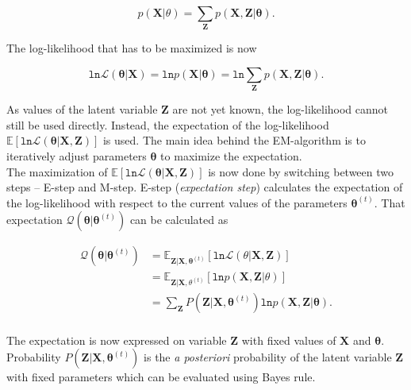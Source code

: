 $$ p(\mathbf{X} | \theta) = \sum_{\mathbf{Z}}p(\mathbf{X}, \mathbf{Z} | \boldsymbol \theta). $$

The log-likelihood that has to be maximized is now 

\begin{equation}
	\mathtt{ln}\mathcal{L}(\boldsymbol \theta | \mathbf{X}) = \mathtt{ln}p(\mathbf{X} | \boldsymbol \theta) = \mathtt{ln}\sum_{\mathbf{Z}}p(\mathbf{X}, \mathbf{Z} | \boldsymbol \theta).
\end{equation}

As values of the latent variable $\mathbf{Z}$ are not yet known, the log-likelihood cannot still be used directly. Instead,  the expectation of the log-likelihood $\mathbb{E}[ \mathtt{ln} \mathcal{L}(\boldsymbol \theta | \mathbf{X}, \mathbf{Z}) ]$ is used. The main idea behind the EM-algorithm is to iteratively adjust parameters $\boldsymbol \theta$ to maximize the expectation. \\

The maximization of  $\mathbb{E}[ \mathtt{ln} \mathcal{L}(\boldsymbol \theta | \mathbf{X}, \mathbf{Z}) ]$ is now done by switching between two steps -- E-step and M-step. E-step (\textit{expectation step}) calculates the expectation of the log-likelihood with respect to the current values of the parameters  $ \boldsymbol\theta^{(t)}$. That expectation $\mathcal{Q}( \boldsymbol \theta | \boldsymbol \theta^{(t)})$ can be calculated as

\begin{equation} \label{eq1}
\begin{split}
  \mathcal{Q}(\boldsymbol \theta | \boldsymbol \theta^{(t)}) &= \mathbb{E}_{\mathbf{Z} | \mathbf{X}, \boldsymbol \theta^{(t)}}[ \mathtt{ln} \mathcal{L}(\theta | \mathbf{X}, \mathbf{Z}) ] \\
     &= \mathbb{E}_{\mathbf{Z} | \mathbf{X}, \theta^{(t)}}[ \mathtt{ln} p(\mathbf{X}, \mathbf{Z} | \theta) ] \\
      &= \sum_{\mathbf{Z}}P(\mathbf{Z}| \mathbf{X}, \boldsymbol \theta^{(t)})\mathtt{ln} p(\mathbf{X}, \mathbf{Z} | \boldsymbol \theta). \\
\end{split}
\end{equation}

The expectation is now expressed on variable $\mathbf{Z}$ with fixed values of $\mathbf{X}$ and $\boldsymbol \theta$. Probability $P(\mathbf{Z}| \mathbf{X}, \boldsymbol \theta^{(t)})$ is the \textit{a posteriori } probability of the latent variable $\mathbf{Z}$ with fixed parameters which can be evaluated using Bayes rule. \\

